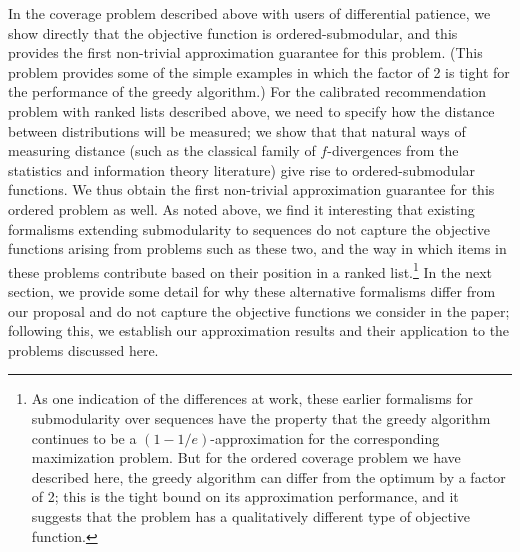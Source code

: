 In the coverage problem described above 
with users of differential patience, we show directly that
the objective function is ordered-submodular, and this provides
the first non-trivial approximation guarantee for this problem.
(This problem provides some of the simple examples
in which the factor of 2 is tight for the performance of
the greedy algorithm.)
For the calibrated recommendation problem with ranked lists
described above, we need to specify how the distance between
distributions will be measured;
we show that that natural ways of measuring distance (such as the
classical family of $f$-divergences from the statistics and
information theory literature) give rise to ordered-submodular functions.
We thus obtain the first non-trivial approximation guarantee for this 
ordered problem as well.
As noted above, we find it interesting that existing formalisms
extending submodularity to sequences do not capture the
objective functions arising from problems such as these two,
and the way in which items in these problems 
contribute based on their position in a ranked list.\footnote{As one
indication of the differences at work, these earlier formalisms 
for submodularity over sequences have the property that 
the greedy algorithm continues to be a $(1-1/e)$-approximation
for the corresponding maximization problem.
But for the ordered coverage problem we have described here,
the greedy algorithm can differ from the optimum by a factor of 2;
this is the tight bound on its approximation performance, and it suggests
that the problem has a qualitatively different type of objective function.}
In the next section, we provide some detail for why these
alternative formalisms differ from our proposal and do not capture the objective functions
we consider in the paper; following this, we establish our
approximation results and their application to the problems discussed here.

%






